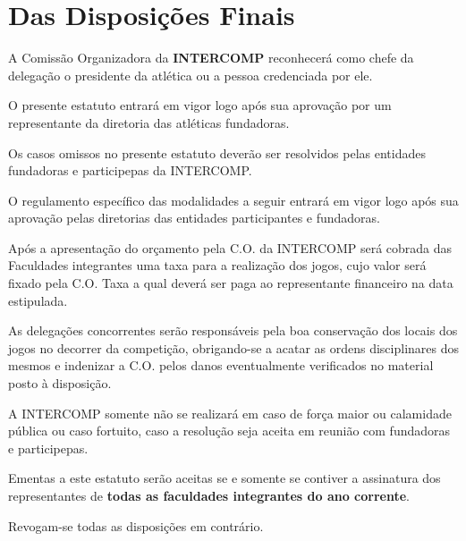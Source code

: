 {\let\clearpage\relax \chapter{Das Disposições Finais}}

\begin{article}
	A Comissão Organizadora da \textbf{INTERCOMP} reconhecerá como chefe da delegação o presidente da atlética ou a pessoa credenciada por ele.
\end{article}

\begin{article}
	O presente estatuto entrará em vigor logo após sua aprovação por um representante da diretoria das atléticas fundadoras.
\end{article}

\begin{article}
	Os casos omissos no presente estatuto deverão ser resolvidos pelas entidades fundadoras e participepas da INTERCOMP.
\end{article}

\begin{article}
	O regulamento específico das modalidades a seguir entrará em vigor logo após sua aprovação pelas diretorias das entidades participantes e fundadoras.
\end{article}

\begin{article}
	Após a apresentação do orçamento pela C.O. da INTERCOMP será cobrada das Faculdades integrantes uma taxa para a realização dos jogos, cujo valor será fixado pela C.O. Taxa a qual deverá ser paga ao representante financeiro na data estipulada.
\end{article}

\begin{article}
	As delegações concorrentes serão responsáveis pela boa conservação dos locais dos jogos no decorrer da competição, obrigando-se a acatar as ordens disciplinares dos mesmos e indenizar a C.O. pelos danos eventualmente verificados no material posto à disposição.
\end{article}

\begin{article}
	A INTERCOMP somente não se realizará em caso de força maior ou calamidade pública ou caso fortuito, caso a resolução seja aceita em reunião com fundadoras e participepas.
\end{article}

\begin{article}
	Ementas a este estatuto serão aceitas se e somente se contiver a assinatura dos representantes de \textbf{todas as faculdades integrantes do ano corrente}.
\end{article}

\begin{article}
	Revogam-se todas as disposições em contrário.
\end{article}
